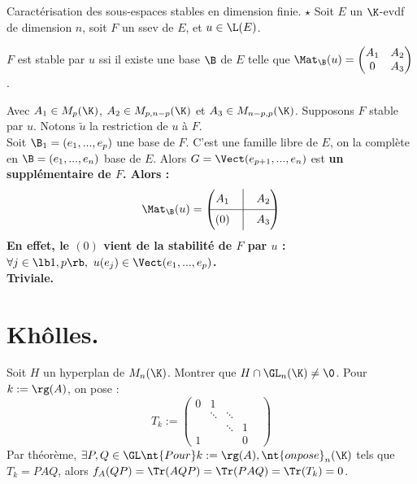 \documentclass[11pt]{article}
\begin{document}
\vspace*{-0.4cm}

\begin{thm}{Caractérisation des sous-espaces stables en dimension finie. $\star$}{}
    Soit $E$ un $\K$-evdf de dimension $n$, soit $F$ un ssev de $E$, et $u\in\L(E)$.
    \begin{center}
        $F$ est stable par $u$ ssi il existe une base $\B$ de $E$ telle que $\Mat_{\B}(u)=\begin{pmatrix}A_1&A_2\\0&A_3\end{pmatrix}$.
    \end{center}
    Avec $A_1\in M_{p}(\K)$, $A_2\in M_{p,n-p}(\K)$ et $A_3\in M_{n-p,p}(\K)$.
    \tcblower
    \boxed{\ra} Supposons $F$ stable par $u$. Notons $\tilde{u}$ la restriction de $u$ à $F$.\\
    Soit $\B_1=(e_1,...,e_p)$ une base de $F$. C'est une famille libre de $E$, on la complète en $\B=(e_1,...,e_n)$ base de $E$. Alors $G=\Vect(e_{p+1},...,e_n)$ est \bf{un} supplémentaire de $F$. Alors :
    \begin{equation*}
        \Mat_{\B}(u)=\begin{pmatrix}A_1&\Big|&A_2\\\hline(0)&\Big|&A_3\end{pmatrix}
    \end{equation*}
    En effet, le $(0)$ vient de la stabilité de $F$ par $u$ : $\forall j \in \lb1,p\rb, ~ u(e_j)\in\Vect(e_1,...,e_p)$.\\
    \boxed{\la} Triviale.
\end{thm}

\fin

\section{Khôlles.}

\begin{exercice}{}{}
    Soit $H$ un hyperplan de $M_n(\K)$. Montrer que $H\cap \GL_n(\K)\neq\0$.
    \tcblower
    Pour $k := \rg(A)$, on pose : 
    \begin{equation*}
       T_k := \begin{pmatrix}
            0 & 1 & & \\ & \ddots & \ddots & & \\ & & \ddots & 1 & \\ 1 & & & 0
        \end{pmatrix}
    \end{equation*}
    Par théorème, $\exists P,Q\in\GL \nt{Pour } k := \rg(A), \nt{ on pose } _n(\K)$ tels que $T_k=PAQ$, alors $f_A(QP)=\Tr(AQP)=\Tr(PAQ)=\Tr(T_k)=0$.
\end{exercice}
\end{document}
